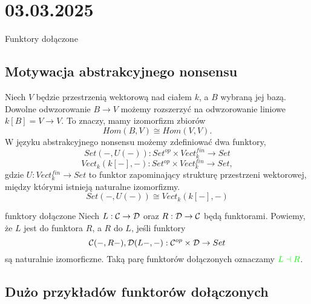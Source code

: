\section{03.03.2025}{Funktory dołączone}

\subsection{Motywacja abstrakcyjnego nonsensu}

Niech $V$ będzie przestrzenią wektorową nad ciałem $k$, a $B$ wybraną jej bazą. Dowolne odwzorowanie $B\to V$ możemy rozszerzyć na odwzorowanie liniowe $k[B]=V\to V$. To znaczy, mamy izomorfizm zbiorów
$$Hom(B, V)\cong Hom(V, V).$$
W języku abstrakcyjnego nonsensu możemy zdefiniować dwa funktory, 
$$Set(-, U(-)):Set^{op}\times Vect_k^{fin}\to Set$$
$$Vect_k(k[-], -):Set^{op}\times Vect_k^{fin}\to Set,$$
gdzie $U:Vect_k^{fin}\to Set$ to funktor zapominający strukturę przestrzeni wektorowej, między którymi istnieją naturalne izomorfizmy.
$$Set(-, U(-))\cong Vect_k(k[-], -)$$

\begin{definition}{funktory dołączone}{}
  Niech $L:\mathcal{C}\to\mathcal{D}$ oraz $R:\mathcal{D}\to \mathcal{C}$ będą funktorami. Powiemy, że $L$ jest  do funktora $R$, a $R$  do $L$, jeśli funktory
  $$\mathcal{C}(-, R-), \mathcal{D}(L-, -):\mathcal{C}^{op}\times \mathcal{D}\to Set$$
  są naturalnie izomorficzne. Taką parę funktorów dołączonych oznaczamy $\color{green}L\dashv R$.
\end{definition}

\subsection{Dużo przykładów funktorów dołączonych}

